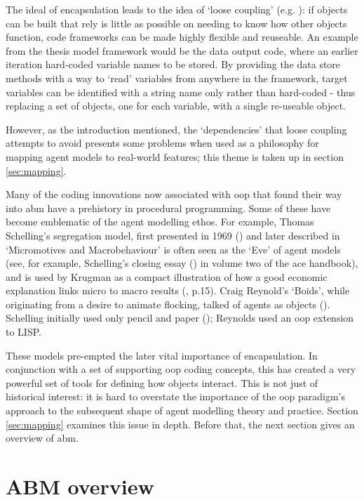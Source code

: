 The ideal of encapsulation leads to the idea of `loose coupling' (e.g. \citealt{jana_java_2005}): if objects can be built that rely is little as possible on needing to know how other objects function, code frameworks can be made highly flexible and reuseable. An example from the thesis model framework would be the data output code, where an earlier iteration hard-coded variable names to be stored. By providing the data store methods with a way to `read' variables from anywhere in the framework, target variables can be identified with a string name only rather than hard-coded - thus replacing a set of objects, one for each variable, with a single re-useable object.

However, as the introduction mentioned, the `dependencies' that loose coupling attempts to avoid presents some problems when used as a philosophy for mapping agent models to real-world features; this theme is taken up in section \ref{sec:mapping}.

Many of the coding innovations now associated with \gls{oop} that found their way into \gls{abm} have a prehistory in procedural programming. Some of these have become emblematic of the agent modelling ethos. For example, Thomas Schelling's segregation model, first presented in 1969 (\citealt{schelling_models_1969}) and later described in `Micromotives and Macrobehaviour' \citep{schelling_micromotives_1978} is often seen as the `Eve' of agent models (see, for example, Schelling's closing essay (\citeyear{schelling_fun_2006}) in volume two of the \gls{ace} handbook), and is used by Krugman as a compact illustration of how a good economic explanation links micro to macro results  (\citealt{krugman_self_1996}, p.15). Craig Reynold's `Boids', while originating from a desire to animate flocking, talked of agents as objects (\citealt{reynolds_flocks_1987}). Schelling initially used only pencil and paper (\citealt{schelling_fun_2006}); Reynolds used an \gls{oop} extension to LISP. 

These models pre-empted the later vital importance of encapsulation. In conjunction with a set of supporting \gls{oop} coding concepts, this has created a very powerful set of tools for defining how objects interact. This is not just of historical interest: it is hard to overstate the importance of the \gls{oop} paradigm's approach to the subsequent shape of agent modelling theory and practice. Section \ref{sec:mapping} examines this issue in depth. Before that, the next section gives an overview of \gls{abm}.

\section{ABM overview \label{sec:abmlit}}

